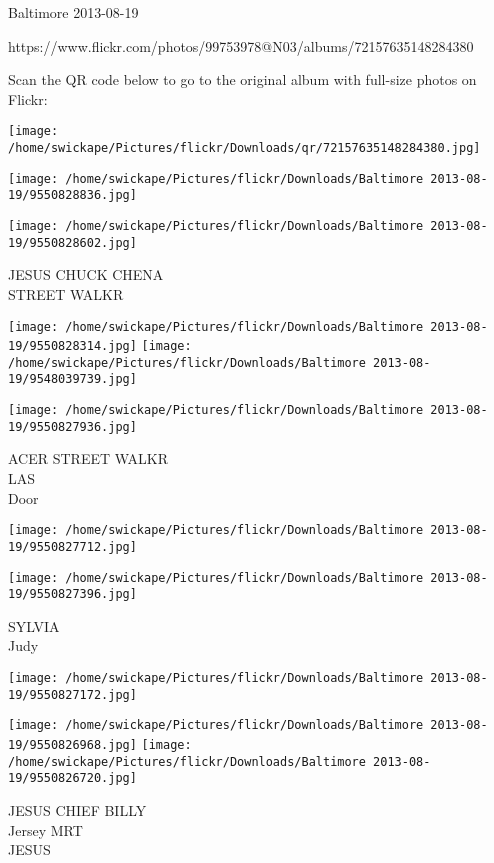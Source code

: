 \documentclass[10pt,letterpaper]{article}
\begin{document}
Baltimore 2013-08-19

https://www.flickr.com/photos/99753978@N03/albums/72157635148284380

Scan the QR code below to go to the original album with full-size photos on Flickr:

\texttt{[image: /home/swickape/Pictures/flickr/Downloads/qr/72157635148284380.jpg]}
\pagebreak

\texttt{[image: /home/swickape/Pictures/flickr/Downloads/Baltimore 2013-08-19/9550828836.jpg]}

\vspace{0.25in}
\texttt{[image: /home/swickape/Pictures/flickr/Downloads/Baltimore 2013-08-19/9550828602.jpg]}

JESUS CHUCK CHENA\\
STREET WALKR\\
\pagebreak

\texttt{[image: /home/swickape/Pictures/flickr/Downloads/Baltimore 2013-08-19/9550828314.jpg]}
\texttt{[image: /home/swickape/Pictures/flickr/Downloads/Baltimore 2013-08-19/9548039739.jpg]}

\texttt{[image: /home/swickape/Pictures/flickr/Downloads/Baltimore 2013-08-19/9550827936.jpg]}

ACER STREET WALKR\\
LAS\\
Door\\
\pagebreak

\texttt{[image: /home/swickape/Pictures/flickr/Downloads/Baltimore 2013-08-19/9550827712.jpg]}

\vspace{0.25in}
\texttt{[image: /home/swickape/Pictures/flickr/Downloads/Baltimore 2013-08-19/9550827396.jpg]}

SYLVIA\\
Judy\\
\pagebreak

\texttt{[image: /home/swickape/Pictures/flickr/Downloads/Baltimore 2013-08-19/9550827172.jpg]}

\vspace{0.25in}
\texttt{[image: /home/swickape/Pictures/flickr/Downloads/Baltimore 2013-08-19/9550826968.jpg]}
\texttt{[image: /home/swickape/Pictures/flickr/Downloads/Baltimore 2013-08-19/9550826720.jpg]}

JESUS CHIEF BILLY\\
Jersey MRT\\
JESUS\\
\pagebreak
\end{document}
